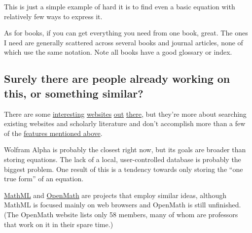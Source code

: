\documentclass[12pt,letterpaper]{article}
\begin{document}

This is just a simple example of hard it is to find even a basic equation with relatively few ways to express it.


As for books, if you can get everything you need from one book, great.
The ones I need are generally scattered across several books and journal articles,
none of which use the same notation.
Note all books have a good glossary or index.

\subsection{Surely there are people already working on this, or something similar?}

There are some
\href{http://symbolab.com}
{interesting}
\href{http://latexsearch.com/}
{websites}
\href{http://www.dessci.com/en/reference/searching/math-searching.htm}
{out}
\href{http://www.equationsheet.com/}
{there},
but they're more about searching existing websites and scholarly literature
and don't accomplish more than a few of the \hyperref[sec:features]{features mentioned above}.



Wolfram Alpha is probably the closest right now,
but its goals are broader than storing equations.
The lack of a local, user-controlled database is probably the biggest problem.
One result of this is a tendency towards only storing the ``one true form'' of an equation.

\href{http://www.w3.org/Math/}
{MathML}
and
\href{http://www.openmath.org/}
{OpenMath} are projects that employ similar ideas,
although MathML is focused mainly on web browsers and OpenMath is still unfinished.
(The OpenMath website lists only 58 members,
many of whom are professors that work on it in their spare time.)
\end{document}
